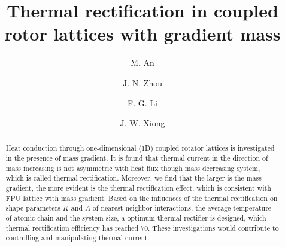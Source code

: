 \documentclass[pra,preprint,superscriptaddress,showkeys,showpacs]{revtex4}
\begin{document}

\title{ Thermal rectification in coupled rotor lattices with gradient mass}


\author{M. An}
\author{J. N. Zhou}
\author{F. G. Li}
\author{J. W. Xiong}




\begin{abstract}
\indent Heat conduction through one-dimensional (1D) coupled rotator
lattices is investigated in the presence of mass gradient. It is found that thermal current in the
direction of mass increasing is not asymmetric with heat flux though
mass decreasing system, which is called thermal rectification.
Moreover, we find that the larger is the mass gradient, the more
evident is the thermal rectification effect, which is consistent
with FPU lattice with mass gradient. Based on the influences
of the thermal rectification on shape parameters $K$ and $A$ of
nearest-neighbor interactions, the average temperature of atomic
chain and the system size, a optimum thermal rectifier is designed,
which thermal rectification efficiency has reached 70. These
investigations would contribute to controlling and manipulating
thermal current.
\end{abstract}
\end{document}
